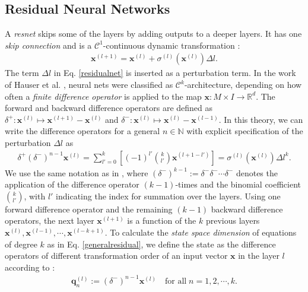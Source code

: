 \documentclass[envcountsect,runningheads]{llncs}
\begin{document}
\subsection{Residual Neural Networks}
\label{resnet}
A \textit{resnet} skips some of the layers by adding outputs to a deeper layers. It has one \textit{skip connection} and is a $\mathcal{C}^1$-continuous dynamic transformation :
\begin{align}
	\label{residualnet}
	\textbf{x}^{(l+1)} = \textbf{x}^{(l)} + \sigma^{(l)}\left(\textbf{x}^{(l)}\right) \Delta l.
\end{align}
The term $\Delta l$ in Eq. \ref{residualnet} is inserted as a perturbation term. In the work of Hauser et al. , neural nets were classified as $\mathcal{C}^k$-architecture, depending on how often a \textit{finite difference operator} is applied to the map $\textbf{x}: M \times I \rightarrow \mathbb{R}^d$. The forward and backward difference operators are defined as $\delta^{+}: \textbf{x}^{(l)} \mapsto \textbf{x}^{(l+1)} - \textbf{x}^{(l)}$ and $\delta^{-}: \textbf{x}^{(l)} \mapsto \textbf{x}^{(l)} - \textbf{x}^{(l-1)}$. In this theory, we can write the difference operators for a general $n \in \mathbb{N}$ with explicit specification of the perturbation $\Delta l$ as
\begin{align}
	\label{generalresidual}
	\delta^+\left( \delta^- \right)^{n-1} \textbf{x}^{(l)} = \sum_{l'=0}^{k} \left[ (-1)^{l'} {k \choose l'} \textbf{x}^{(l+1-l')} \right] = \sigma^{(l)} \left(\textbf{x}^{(l)}\right) \Delta l^k.
\end{align}
We use the same notation as in , where $(\delta^-)^{k-1} := \delta^- \delta^- \cdots \delta^-$ denotes the application of the difference operator $(k-1)$-times and the binomial coefficient ${k \choose l'}$, with $l'$ indicating the index for summation over the layers. Using one forward difference operator and the remaining $(k-1)$ backward difference operators, the next layer $\textbf{x}^{(l+1)}$ is a function of the $k$ previous layers $\textbf{x}^{(l)}, \textbf{x}^{(l-1)}, \cdots, \textbf{x}^{(l-k+1)}$. To calculate the \textit{state space dimension} of equations of degree $k$ as in Eq. \ref{generalresidual}, we define the state as the difference operators of different transformation order of an input vector $\textbf{x}$ in the layer $l$ according to :
\begin{align}
	\textbf{q}_n^{(l)} := \left( \delta^- \right)^{n-1} \textbf{x}^{(l)} \quad \text{for all} \; n = 1,2,\cdots,k.
\end{align}
\end{document}
